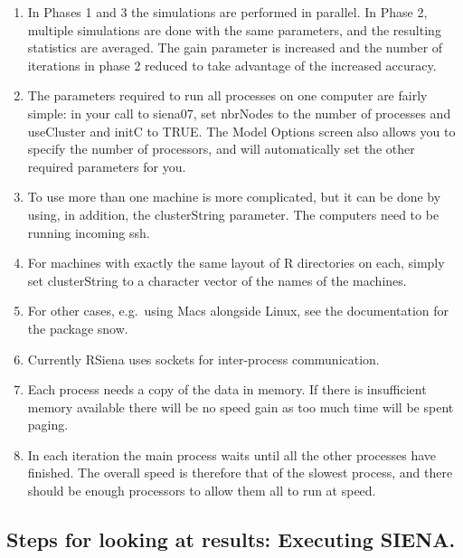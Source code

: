 \documentclass[a4paper,fleqn]{article}
\newcommand{\+}{\, + \,}
\newcommand{\sfn}[1]{\textsf{#1}}
\newcommand{\R}{{\sf R }}
\newcommand{\RS}{{\sf RSiena }}
\newcommand{\si}{{\sf SIENA}}
\begin{document}
{\begin{enumerate}
\item In Phases 1 and 3 the simulations are performed in parallel. In Phase 2,
  multiple simulations are done with the same parameters, and the resulting
  statistics are averaged. The gain parameter is increased and the
  number of iterations in phase 2 reduced to take advantage of
  the increased accuracy.

\item The parameters required to run all processes on one computer are fairly
  simple: in your call to \sfn{siena07}, set \sfn{nbrNodes} to the number of
  processes and \sfn{useCluster} and \sfn{initC} to TRUE. The \sfn{Model
    Options} screen also allows you to specify the number of processors, and
  will automatically set the other required parameters for you.

\item To use more than one machine is more complicated, but it can be done by
  using, in addition, the \sfn{clusterString} parameter.  The computers need to
  be running incoming \sfn{ssh}.
\item For machines with exactly the same layout of \R
  directories on each, simply set \sfn{clusterString} to a character vector of
  the names of the machines.
\item For other cases, e.g.\ using Macs alongside Linux,
  see the documentation for the package \sfn{snow}.

\item Currently \RS uses sockets for inter-process communication.
\item Each process needs a copy of the data in memory. If there is insufficient
  memory available there will be no speed gain as too much time will be spent
  paging.
\item In each iteration the main process waits until all the other processes
  have finished. The overall speed is therefore that of the slowest process, and
  there should be enough processors to allow them all to run at speed.
\end{enumerate}

\subsection{Steps for looking at results: Executing \si .}
\label{S_exec}

}
\end{document}
